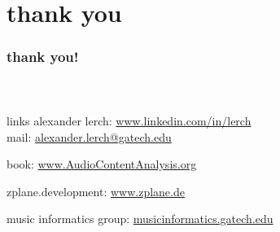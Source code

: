     \section[thanks]{thank you}

      \begin{frame}\frametitle{thank you!}\framesubtitle{~}
            \begin{block}{links}
                alexander lerch: \href{https://www.linkedin.com/in/lerch}{www.linkedin.com/in/lerch}\\             
                
								\bigskip
								mail: \href{mailto:alexander.lerch@gatech.edu}{alexander.lerch@gatech.edu}
                
								\pause
                \bigskip                
                book: \href{https://www.AudioContentAnalysis.org}{www.AudioContentAnalysis.org}
                

								\pause
                \bigskip
                zplane.development: 
                \href{https://www.zplane.de}{www.zplane.de}

                \pause
								\bigskip
                music informatics group:
                \href{http://musicinformatics.gatech.edu}{musicinformatics.gatech.edu}
								
								\vspace{5mm}

            \end{block}
            
        \end{frame}
